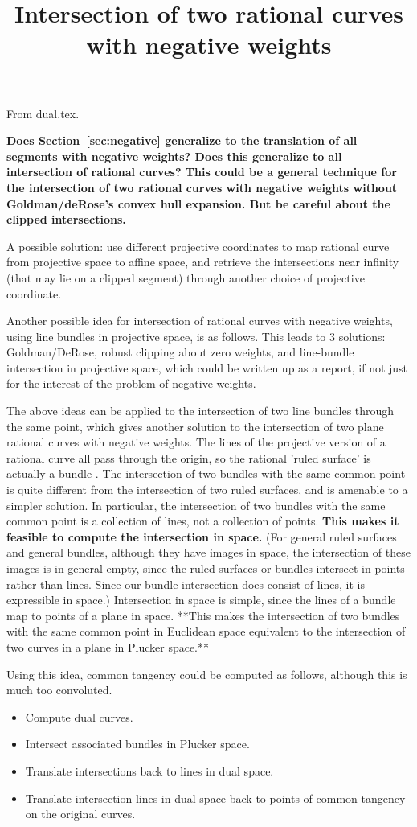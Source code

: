 From dual.tex.

\title{Intersection of two rational curves with negative weights}

{\bf Does Section~\ref{sec:negative} generalize to the translation of 
all segments with negative weights?
Does this generalize to all intersection of rational curves?
This could be a general technique for the intersection of 
two rational curves with negative weights without Goldman/deRose's convex hull
expansion.
But be careful about the clipped intersections.

A possible solution: use different projective coordinates to map 
rational curve from projective space to affine space,
and retrieve the intersections near infinity (that may lie on a clipped
segment) through another choice of projective coordinate.

Another possible idea for intersection of rational curves with negative 
weights, using line bundles in projective space, is as follows.
This leads to 3 solutions: Goldman/DeRose, robust clipping about zero weights,
and line-bundle intersection in projective space, which could be written
up as a report, if not just for the interest of the problem
of negative weights.

The above ideas can be applied to the intersection of two line bundles
through the same point,
which gives another solution to the intersection of two plane rational
curves with negative weights.
The lines of the projective version of a rational curve 
all pass through the origin,
so the rational 'ruled surface' is actually a bundle \cite{pottmann99}.
The intersection of two bundles with the same common point
is quite different from the intersection of two ruled surfaces,
and is amenable to a simpler solution.
In particular, the intersection of two bundles with the same common point
is a collection of lines, not a collection of points.
{\bf This makes it feasible to compute the intersection in \plucker space.}
(For general ruled surfaces and general bundles,
although they have images in \plucker space,
the intersection of these images is in general empty, since the 
ruled surfaces or bundles intersect in points rather than lines.
Since our bundle intersection does consist of lines, it is 
expressible in \plucker space.)
Intersection in \plucker space is simple, 
since the lines of a bundle map to points of a plane in \plucker space. %
**This makes the intersection of two bundles with the same common point in Euclidean space 
equivalent to the intersection of two curves in a plane in Plucker space.**

Using this idea, common tangency could be computed as follows,
although this is much too convoluted.
\begin{itemize}
\item	Compute dual curves.
\item	Intersect associated bundles in Plucker space.
\item 	Translate intersections back to lines in dual space.
\item 	Translate intersection lines in dual space back to points of common
	tangency on the original curves.
\end{itemize}
}


